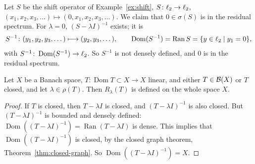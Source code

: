 \begin{example}
Let $S$ be the shift operator of Example~\ref{ex:shift},
$S \colon \ell_{2} \to \ell_{2}$,
$(x_1, x_2, x_3, \dots) \mapsto (0, x_1, x_2, x_3, \dots)$. We claim that
$0 \in \sigma(S)$ is in the residual spectrum. For $\lambda = 0$,
$(S - \lambda I)^{-1}$ exists; it is
\[
  S^{-1} \colon (y_1, y_2, y_3, \dots) \longmapsto (y_2, y_3, \dots) ,
  \qquad
  \operatorname{Dom}(S^{-1}) = \operatorname{Ran} S
  = \{y \in \ell_{2} \mid y_1 = 0\} ,
\]
with $S^{-1} \colon \operatorname{Dom}(S^{-1}) \to \ell_{2}$. So $S^{-1}$ is not
densely defined, and $0$ is in the residual spectrum.
\end{example}

\begin{lemma}\label{lem:resolvent-domain}
Let $X$ be a Banach space, $T \colon \operatorname{Dom} T \subset X \to X$
linear, and either $T \in \mathcal{B}(X)$ or $T$ closed, and let
$\lambda \in \rho(T)$. Then $R_\lambda(T)$ is defined on the whole space
$X$.
\end{lemma}

\begin{proof}
If $T$ is closed, then $T - \lambda I$ is closed, and
$(T - \lambda I)^{-1}$ is also closed. But $(T - \lambda I)^{-1}$ is bounded
and densely defined: $\operatorname{Dom}((T - \lambda I)^{-1})
= \operatorname{Ran}(T - \lambda I)$ is dense. This implies that
$\operatorname{Dom}((T - \lambda I)^{-1})$ is closed, by the closed graph
theorem, Theorem~\ref{thm:closed-graph}. So
$\operatorname{Dom}((T - \lambda I)^{-1}) = X$.
\end{proof}
